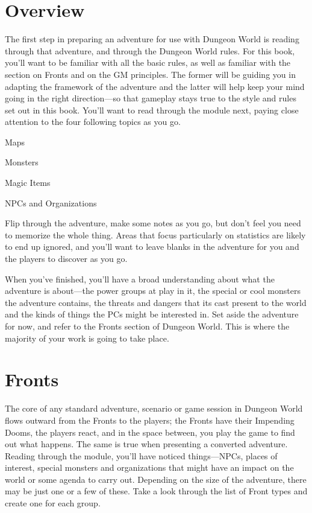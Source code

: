  
\section{Overview}   
 

The first step in preparing an adventure for use with Dungeon World is reading through that adventure, and through the Dungeon World rules. For this book, you’ll want to be familiar with all the basic rules, as well as familiar with the section on Fronts and on the GM principles. The former will be guiding you in adapting the framework of the adventure and the latter will help keep your mind going in the right direction—so that gameplay stays true to the style and rules set out in this book. You’ll want to read through the module next, paying close attention to the four following topics as you go.

 
\startitemize[1,packed]

\item Maps

 
\item Monsters

 
\item Magic Items

 
\item NPCs and Organizations


\stopitemize
 

Flip through the adventure, make some notes as you go, but don’t feel you need to memorize the whole thing. Areas that focus particularly on statistics are likely to end up ignored, and you’ll want to leave blanks in the adventure for you and the players to discover as you go.

 

When you’ve finished, you’ll have a broad understanding about what the adventure is about—the power groups at play in it, the special or cool monsters the adventure contains, the threats and dangers that its cast present to the world and the kinds of things the PCs might be interested in. Set aside the adventure for now, and refer to the Fronts section of Dungeon World. This is where the majority of your work is going to take place.

 
\section{Fronts}   
 

The core of any standard adventure, scenario or game session in Dungeon World flows outward from the Fronts to the players; the Fronts have their Impending Dooms, the players react, and in the space between, you play the game to find out what happens. The same is true when presenting a converted adventure. Reading through the module, you’ll have noticed things—NPCs, places of interest, special monsters and organizations that might have an impact on the world or some agenda to carry out. Depending on the size of the adventure, there may be just one or a few of these. Take a look through the list of Front types and create one for each group.

